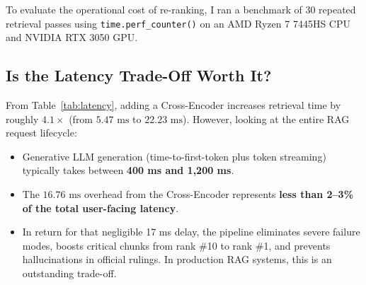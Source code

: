 \documentclass[11pt,a4paper]{article}
\begin{document}
To evaluate the operational cost of re-ranking, I ran a benchmark of 30 repeated retrieval passes using \texttt{time.perf\_counter()} on an AMD Ryzen 7 7445HS CPU and NVIDIA RTX 3050 GPU.

\begin{table}[h!]
\centering
\small
{}
\caption{Empirical latency benchmark measured over 30 evaluation passes.}
\label{tab:latency}
\end{table}

\subsection{Is the Latency Trade-Off Worth It?}
From Table~\ref{tab:latency}, adding a Cross-Encoder increases retrieval time by roughly \textbf{$4.1\times$} (from $5.47\text{ ms}$ to $22.23\text{ ms}$). However, looking at the entire RAG request lifecycle:
\begin{itemize}[itemsep=1.5pt,topsep=1.5pt]
    \item Generative LLM generation (time-to-first-token plus token streaming) typically takes between \textbf{400 ms and 1,200 ms}.
    \item The $16.76\text{ ms}$ overhead from the Cross-Encoder represents \textbf{less than 2--3\% of the total user-facing latency}.
    \item In return for that negligible 17 ms delay, the pipeline eliminates severe failure modes, boosts critical chunks from rank \#10 to rank \#1, and prevents hallucinations in official rulings. In production RAG systems, this is an outstanding trade-off.
\end{itemize}
\end{document}
